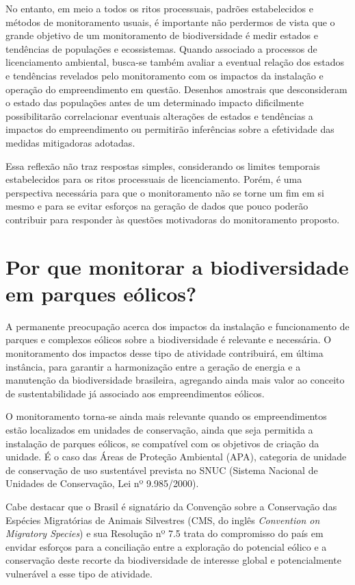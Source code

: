 \documentclass[
  oneside]{scrbook}
\begin{document}
No entanto, em meio a todos os ritos processuais, padrões estabelecidos e métodos de monitoramento usuais, é importante não perdermos de vista que o grande objetivo de um monitoramento de biodiversidade é medir estados e tendências de populações e ecossistemas. Quando associado a processos de licenciamento ambiental, busca-se também avaliar a eventual relação dos estados e tendências revelados pelo monitoramento com os impactos da instalação e operação do empreendimento em questão. Desenhos amostrais que desconsideram o estado das populações antes de um determinado impacto dificilmente possibilitarão correlacionar eventuais alterações de estados e tendências a impactos do empreendimento ou permitirão inferências sobre a efetividade das medidas mitigadoras adotadas.

Essa reflexão não traz respostas simples, considerando os limites temporais estabelecidos para os ritos processuais de licenciamento. Porém, é uma perspectiva necessária para que o monitoramento não se torne um fim em si mesmo e para se evitar esforços na geração de dados que pouco poderão contribuir para responder às questões motivadoras do monitoramento proposto.

\hypertarget{por-que-monitorar-a-biodiversidade-em-parques-euxf3licos}{%
\section{Por que monitorar a biodiversidade em parques eólicos?}\label{por-que-monitorar-a-biodiversidade-em-parques-euxf3licos}}

A permanente preocupação acerca dos impactos da instalação e funcionamento de parques e complexos eólicos sobre a biodiversidade é relevante e necessária. O monitoramento dos impactos desse tipo de atividade contribuirá, em última instância, para garantir a harmonização entre a geração de energia e a manutenção da biodiversidade brasileira, agregando ainda mais valor ao conceito de sustentabilidade já associado aos empreendimentos eólicos.

O monitoramento torna-se ainda mais relevante quando os empreendimentos estão localizados em unidades de conservação, ainda que seja permitida a instalação de parques eólicos, se compatível com os objetivos de criação da unidade. É o caso das Áreas de Proteção Ambiental (APA), categoria de unidade de conservação de uso sustentável prevista no SNUC (Sistema Nacional de Unidades de Conservação, Lei nº 9.985/2000).

Cabe destacar que o Brasil é signatário da Convenção sobre a Conservação das Espécies Migratórias de Animais Silvestres (CMS, do inglês \emph{Convention on Migratory Species}) e sua Resolução nº 7.5 trata do compromisso do país em envidar esforços para a conciliação entre a exploração do potencial eólico e a conservação deste recorte da biodiversidade de interesse global e potencialmente vulnerável a esse tipo de atividade.
\end{document}
